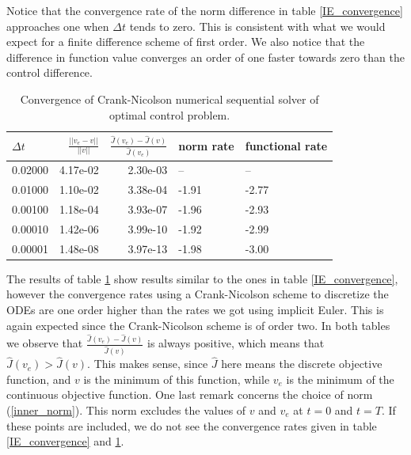 Notice that the convergence rate of the norm difference in table \ref{IE_convergence} approaches one when $\Delta t$ tends to zero. This is consistent with what we would expect for a finite difference scheme of first order. We also notice that the difference in function value converges an order of one faster towards zero than the control difference.  
\begin{table}[!h]
\caption{Convergence of Crank-Nicolson numerical sequential solver of optimal control problem.}\label{CN_convergence}
\centering
\begin{tabular}{lrrll}
\toprule
{} $\Delta t$&    $\frac{||v_e-v||}{||v||}$ &  $\frac{\hat J(v_e)-\hat J(v)}{\hat J(v_e)}$ &   norm rate &    functional rate \\
\midrule
0.02000 &  4.17e-02 &  2.30e-03 &       -- &       -- \\
0.01000 &  1.10e-02 &  3.38e-04 &  -1.91 & -2.77 \\
0.00100 &  1.18e-04 &  3.93e-07 & -1.96 & -2.93 \\
0.00010 &  1.42e-06 &  3.99e-10 & -1.92 & -2.99 \\
0.00001 &  1.48e-08 &  3.97e-13 & -1.98 &  -3.00 \\
\bottomrule
\end{tabular}
\end{table}
The results of table \ref{CN_convergence} show results similar to the ones in table \ref{IE_convergence}, however the convergence rates using a Crank-Nicolson scheme to discretize the ODEs are one order higher than the rates we got using implicit Euler. This is again expected since the Crank-Nicolson scheme is of order two. In both tables we observe that $\frac{\hat J(v_e)-\hat J(v)}{\hat J(v)}$ is always positive, which means that $\hat J(v_e)>\hat J(v)$. This makes sense, since $\hat J$ here means the discrete objective function, and $v$ is the minimum of this function, while $v_e$ is the minimum of the continuous objective function. One last remark concerns the choice of norm (\ref{inner_norm}). This norm excludes the values of $v$ and $v_e$ at $t=0$ and $t=T$. If these points are included, we do not see the convergence rates given in table \ref{IE_convergence} and \ref{CN_convergence}. 
